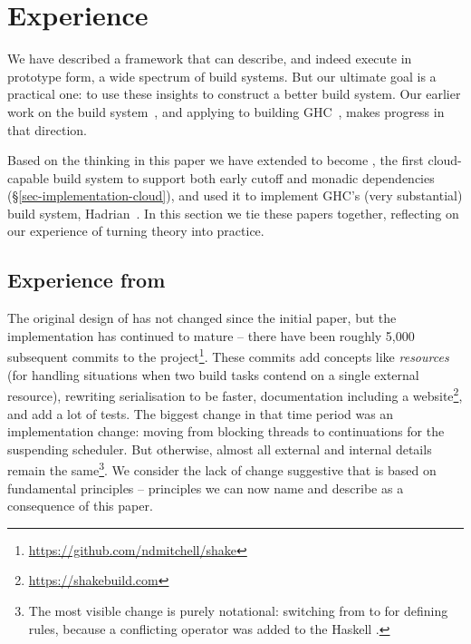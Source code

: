 \section{Experience}\label{sec-experience}

We have described a framework that can describe, and indeed execute in
prototype form, a wide spectrum of build systems.  But our ultimate
goal is a practical one: to use these insights to construct a better
build system.  Our earlier work on the \Shake build
system~\cite{mitchell2012shake}, and applying \Shake to
building GHC~\cite{hadrian}, makes progress in that direction.

Based on the thinking in this paper we have extended \Shake to
become \Cloud \Shake, the first cloud-capable build system to support
both early cutoff and monadic dependencies (\S\ref{sec-implementation-cloud}),
and used it to implement GHC's (very substantial) build system, Hadrian~\cite{hadrian}.
In this section we tie these papers together, reflecting on our
experience of turning theory into practice.

\subsection{Experience from \Shake}\label{sec-experience-shake}

The original design of \Shake has not changed since the initial paper, but the
implementation has continued to mature -- there have been roughly 5,000
subsequent commits to the \Shake
project\footnote{\url{https://github.com/ndmitchell/shake}}. These commits add
concepts like \emph{resources} (for handling situations when two build tasks
contend on a single external resource), rewriting serialisation to be faster,
documentation including a website\footnote{\url{https://shakebuild.com}}, and
add a lot of tests. The biggest change in that time period was an implementation
change: moving from
blocking threads to continuations for the suspending scheduler.
But otherwise, almost all external and internal details remain the same\footnote{
  The most visible change is purely notational: switching from \hs{*>} to 
  for defining rules, because a conflicting \hs{*>} operator was added to the
  Haskell .}.
We consider the lack of change suggestive that \Shake is based on fundamental
principles -- principles we can now name and describe as a consequence
of this paper.

